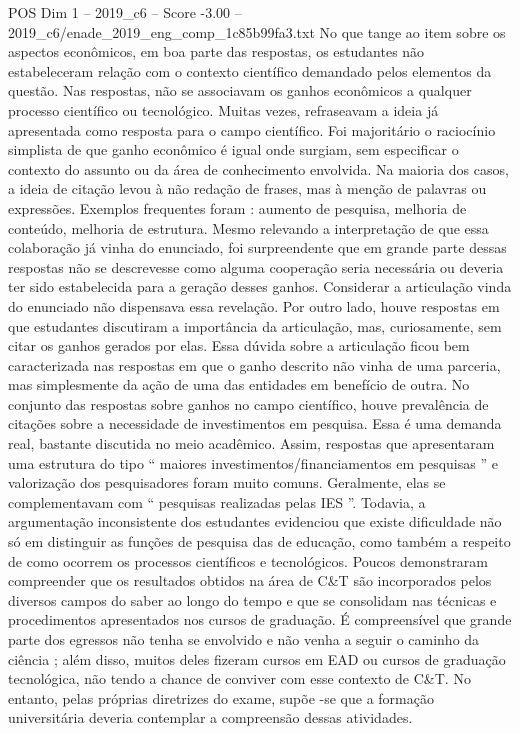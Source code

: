 \begin{textsample}{POS Dim 1 – 2019\_c6 – Score -3.00 – 2019\_c6/enade\_2019\_eng\_comp\_1c85b99fa3.txt}
No que tange ao item sobre os aspectos econômicos, em boa parte das respostas, os estudantes não estabeleceram relação com o contexto científico demandado pelos elementos da questão.
Nas respostas, não se associavam os ganhos econômicos a qualquer processo científico ou tecnológico.
Muitas vezes, refraseavam a ideia já apresentada como resposta para o campo científico.
Foi majoritário o raciocínio simplista de que ganho econômico é igual onde surgiam, sem especificar o contexto do assunto ou da área de conhecimento envolvida.
Na maioria dos casos, a ideia de citação levou à não redação de frases, mas à menção de palavras ou expressões.
Exemplos frequentes foram : aumento de pesquisa, melhoria de conteúdo, melhoria de estrutura.
Mesmo relevando a interpretação de que essa colaboração já vinha do enunciado, foi surpreendente que em grande parte dessas respostas não se descrevesse como alguma cooperação seria necessária ou deveria ter sido estabelecida para a geração desses ganhos.
Considerar a articulação vinda do enunciado não dispensava essa revelação.
Por outro lado, houve respostas em que estudantes discutiram a importância da articulação, mas, curiosamente, sem citar os ganhos gerados por elas.
Essa dúvida sobre a articulação ficou bem caracterizada nas respostas em que o ganho descrito não vinha de uma parceria, mas simplesmente da ação de uma das entidades em benefício de outra.
No conjunto das respostas sobre ganhos no campo científico, houve prevalência de citações sobre a necessidade de investimentos em pesquisa.
Essa é uma demanda real, bastante discutida no meio acadêmico.
Assim, respostas que apresentaram uma estrutura do tipo “ maiores investimentos/financiamentos em pesquisas ” e valorização dos pesquisadores foram muito comuns.
Geralmente, elas se complementavam com “ pesquisas realizadas pelas IES ”.
Todavia, a argumentação inconsistente dos estudantes evidenciou que existe dificuldade não só em distinguir as funções de pesquisa das de educação, como também a respeito de como ocorrem os processos científicos e tecnológicos.
Poucos demonstraram compreender que os resultados obtidos na área de C\&T são incorporados pelos diversos campos do saber ao longo do tempo e que se consolidam nas técnicas e procedimentos apresentados nos cursos de graduação.
É compreensível que grande parte dos egressos não tenha se envolvido e não venha a seguir o caminho da ciência ; além disso, muitos deles fizeram cursos em EAD ou cursos de graduação tecnológica, não tendo a chance de conviver com esse contexto de C\&T.
No entanto, pelas próprias diretrizes do exame, supõe -se que a formação universitária deveria contemplar a compreensão dessas atividades.

\end{textsample}
